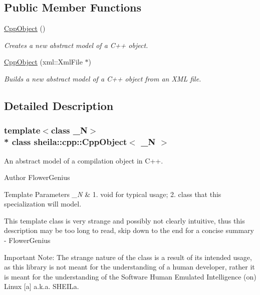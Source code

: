 \subsection*{Public Member Functions}
\begin{DoxyCompactItemize}
\item 
\hyperlink{classsheila_1_1cpp_1_1CppObject_a16175f9d6ace3ea0bbb9e284984ed1fb}{Cpp\+Object} ()
\begin{DoxyCompactList}\small\item\em Creates a new abstract model of a C++ object. \end{DoxyCompactList}\item 
\hyperlink{classsheila_1_1cpp_1_1CppObject_a36c2625f6508c3886e0534c45fdff54f}{Cpp\+Object} (xml\+::\+Xml\+File $\ast$)
\begin{DoxyCompactList}\small\item\em Builds a new abstract model of a C++ object from an X\+ML file. \end{DoxyCompactList}\end{DoxyCompactItemize}


\subsection{Detailed Description}
\subsubsection*{template$<$class \+\_\+N$>$\\*
class sheila\+::cpp\+::\+Cpp\+Object$<$ \+\_\+\+N $>$}

An abstract model of a compilation object in C++. 

\begin{DoxyAuthor}{Author}
Flower\+Genius 
\end{DoxyAuthor}

\begin{DoxyTemplParams}{Template Parameters}
{\em \+\_\+N} & 1. {\ttfamily void} for typical usage; 2. {\ttfamily class} that this specialization will model.\\
\hline
\end{DoxyTemplParams}
This template class is very strange and possibly not clearly intuitive, thus this description may be too long to read, skip down to the end for a concise summary -\/ Flower\+Genius

Important Note\+: The strange nature of the class is a result of it\textquotesingle{}s intended usage, as this library is not meant for the understanding of a human developer, rather it is meant for the understanding of the Software Human Emulated Intelligence (on) Linux \mbox{[}a\mbox{]} a.\+k.\+a. {\ttfamily S\+H\+E\+I\+La}.

